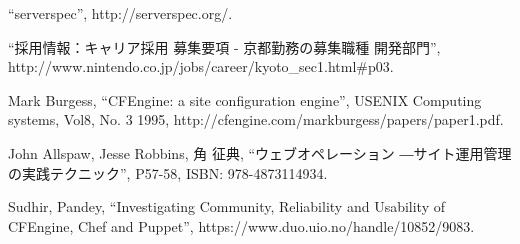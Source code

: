 \begin{thebibliography}{99}
``serverspec'', http://serverspec.org/.

``採用情報：キャリア採用 募集要項 - 京都勤務の募集職種 開発部門'',
http://www.nintendo.co.jp/jobs/career/kyoto\_sec1.html\#p03.

Mark Burgess, ``CFEngine: a site configuration engine'',
USENIX Computing systems, Vol8, No. 3 1995,
http://cfengine.com/markburgess/papers/paper1.pdf.

John Allspaw, Jesse Robbins, 角 征典,
``ウェブオペレーション ―サイト運用管理の実践テクニック'',
P57-58, ISBN: 978-4873114934.

Sudhir, Pandey,
``Investigating Community, Reliability and Usability of CFEngine, Chef and Puppet'',
https://www.duo.uio.no/handle/10852/9083.

\end{thebibliography}
